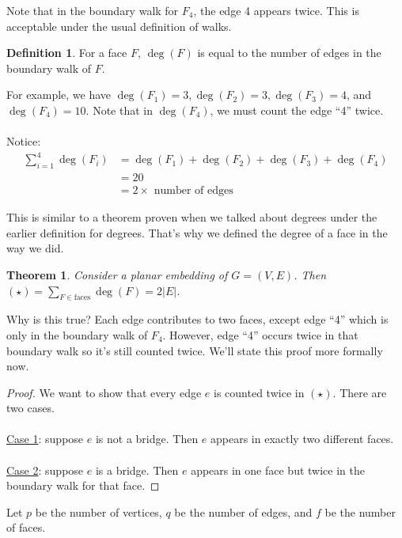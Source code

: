 \documentclass[]{article}
\newtheorem*{theorem}{Theorem}
\theoremstyle{definition}
\newtheorem*{defn}{Definition}
\begin{document}
			Note that in the boundary walk for $F_4$, the edge 4 appears twice. This is acceptable under the usual definition of walks.

			\begin{defn}
				For a face $F$, $\deg(F)$ is equal to the number of edges in the boundary walk of $F$.
			\end{defn}

			For example, we have $\deg(F_1) = 3, \deg(F_2) = 3, \deg(F_3) = 4$, and $\deg(F_4) = 10$. Note that in $\deg(F_4)$, we must count the edge ``4'' twice.
			\\ \\
			Notice:
			\begin{align*}
				\sum_{i = 1}^{4} \deg(F_i) &= \deg(F_1) + \deg(F_2) + \deg(F_3) + \deg(F_4) \\
				&= 20 \\
				&= 2 \times \text{ number of edges}
			\end{align*}

			This is similar to a theorem proven when we talked about degrees under the earlier definition for degrees. That's why we defined the degree of a face in the way we did.

			\begin{theorem}
				Consider a planar embedding of $G = (V, E)$. Then $\displaystyle (\star) = \sum_{F \in \text{faces}} \deg(F) = 2|E|$.
			\end{theorem}

			Why is this true? Each edge contributes to two faces, except edge ``4'' which is only in the boundary walk of $F_4$. However, edge ``4'' occurs twice in that boundary walk so it's still counted twice. We'll state this proof more formally now.
			\begin{proof}
				We want to show that every edge $e$ is counted twice in $(\star)$. There are two cases.
				\\ \\
				\underline{Case 1}: suppose $e$ is not a bridge. Then $e$ appears in exactly two different faces.
				\\ \\
				\underline{Case 2}: suppose $e$ is a bridge. Then $e$ appears in one face but twice in the boundary walk for that face.
			\end{proof}

			Let $p$ be the number of vertices, $q$ be the number of edges, and $f$ be the number of faces.
\end{document}
